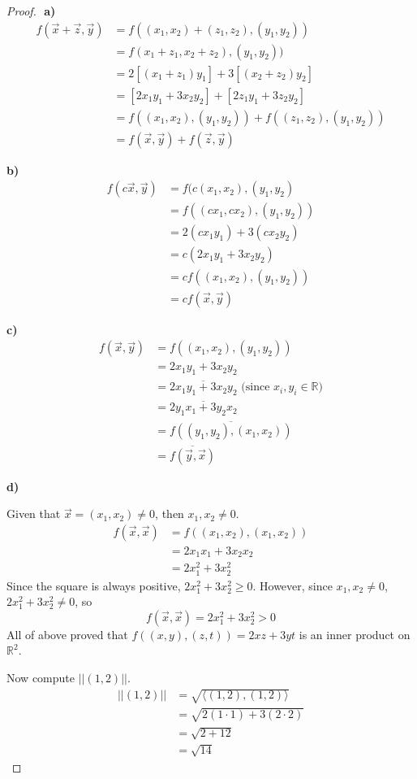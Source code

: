 \documentclass{article}
\begin{document}
\begin{proof}
$ $\newline
\textbf{a)}
\begin{align*}
f(\vec{x}+\vec{z},\vec{y}) &= f((x_1,x_2)+ (z_1,z_2), (y_1,y_2)) \\
&= f(x_1+z_1, x_2+z_2),(y_1,y_2)) \\
&= 2[(x_1+z_1)y_1] +3[(x_2+z_2)y_2] \\
&= [2x_1y_1+3x_2y_2] +[2z_1y_1 +3z_2y_2] \\
&= f((x_1,x_2),(y_1,y_2)) + f((z_1,z_2),(y_1,y_2))\\
&= f(\vec{x}, \vec{y}) + f(\vec{z},\vec{y})
\end{align*}

\textbf{b)}
\begin{align*}
f(c\vec{x}, \vec{y}) &= f(c(x_1,x_2), (y_1,y_2) \\
&= f((cx_1,cx_2),(y_1,y_2)) \\
&= 2(cx_1y_1)+3(cx_2y_2) \\
&= c(2x_1y_1+3x_2y_2) \\
&= cf((x_1,x_2),(y_1,y_2)) \\
&= cf(\vec{x}, \vec{y})
\end{align*}

\textbf{c)}
\begin{align*}
f(\vec{x}, \vec{y}) &= f((x_1,x_2),(y_1,y_2)) \\
&= 2x_1y_1 + 3x_2y_2 \\
&= \overline{2x_1y_1 + 3x_2y_2} \text{ (since $x_i, y_i \in \mathbb{R}$)} \\
&= \overline{2y_1x_1 +3y_2x_2} \\
&= \overline{f((y_1,y_2),(x_1,x_2))} \\
&= \overline{f(\vec{y},\vec{x})}
\end{align*}

\textbf{d)}

Given that $\vec{x} =(x_1,x_2) \ne 0$, then $x_1, x_2 \ne 0$.
\begin{align*}
f(\vec{x},\vec{x}) &= f((x_1,x_2),(x_1,x_2)) \\
&= 2x_1x_1 + 3x_2x_2 \\
&= 2x_1^2 +3 x_2^2 
\end{align*}
Since the square is always positive, $2x_1^2 +3 x_2^2 \ge 0$. However, since $x_1, x_2 \ne 0$, $2x_1^2 +3 x_2^2 \ne 0$, so $$f(\vec{x},\vec{x})=2x_1^2 +3 x_2^2 > 0$$
All of above proved that $f((x,y), (z,t)) = 2xz+3yt$ is an inner product on $\mathbb{R}^2$.
\medskip

Now compute $|| (1,2) ||$.
\begin{align*}
|| (1,2) || &= \sqrt{\langle (1,2) , (1,2) \rangle} \\
&= \sqrt{2(1 \cdot 1) + 3 ( 2 \cdot 2)} \\
&= \sqrt{2+12} \\
&= \sqrt{14}
\end{align*}

\end{proof}
\end{document}
